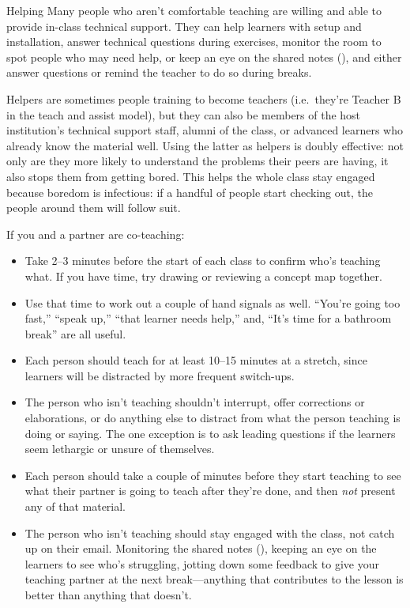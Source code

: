 \begin{aside}{Helping}
  Many people who aren't comfortable teaching
  are willing and able to provide in-class technical support.
  They can help learners with setup and installation,
  answer technical questions during exercises,
  monitor the room to spot people who may need help,
  or keep an eye on the shared notes (),
  and either answer questions
  or remind the teacher to do so during breaks.

  Helpers are sometimes people training to become teachers
  (i.e.\ they're Teacher B in the teach and assist model),
  but they can also be members of the host institution's technical support staff,
  alumni of the class,
  or advanced learners who already know the material well.
  Using the latter as helpers is doubly effective:
  not only are they more likely to understand the problems their peers are having,
  it also stops them from getting bored.
  This helps the whole class stay engaged because boredom is infectious:
  if a handful of people start checking out,
  the people around them will follow suit.
\end{aside}

If you and a partner are co-teaching:

\begin{itemize}

\item
  Take 2--3 minutes before the start of each class
  to confirm who's teaching what.
  If you have time,
  try drawing or reviewing a concept map together.

\item
  Use that time to work out a couple of hand signals as well.
  ``You're going too fast,''
  ``speak up,''
  ``that learner needs help,''
  and, ``It's time for a bathroom break'' are all useful.

\item
  Each person should teach for at least 10--15 minutes at a stretch,
  since learners will be distracted by more frequent switch-ups.

\item
  The person who isn't teaching shouldn't interrupt,
  offer corrections or elaborations,
  or do anything else to distract from what the person teaching is doing or saying.
  The one exception is to ask leading questions
  if the learners seem lethargic or unsure of themselves.

\item
  Each person should take a couple of minutes before they start teaching
  to see what their partner is going to teach after they're done,
  and then \emph{not} present any of that material.

\item
  The person who isn't teaching should stay engaged with the class,
  not catch up on their email.
  Monitoring the shared notes (),
  keeping an eye on the learners to see who's struggling,
  jotting down some feedback to give your teaching partner at the next break---anything
  that contributes to the lesson is better than anything that doesn't.

\end{itemize}

